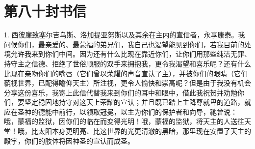 

\section{第八十封书信}

\par

\par

1. 西彼廉致塞尔吉乌斯、洛加提亚努斯以及其余在主内的宣信者，永享康泰。我问候你们，最亲爱的、最蒙福的弟兄们，我自己也渴望能见到你们，若我目前的处境允许我来到你们中间。因为还有什么比现在靠近你们，让你们用那些纯洁无罪、持守主之信德、拒绝了世俗顺服的双手来拥抱我，更令我渴望和喜乐呢？还有什么比现在亲吻你们的嘴唇（它们曾以荣耀的声音宣认了主），并被你们的眼睛（它们藐视世界，已配得瞻仰天主）所注视，更令人愉快和崇高呢？但是由于我没有机会分享这份喜乐，我寄上此信代替我来到你们的耳中和眼中，借此我祝贺并劝勉你们，要坚定稳固地持守对这天上荣耀的宣认；并且既已踏上主降尊就卑的道路，就应在圣神的德能中前行，以领取冠冕，以主为你们的保护者和向导，祂曾说： 哦，蒙福的监狱，因你们的临在而变得光明！哦，蒙福的监狱，将天主的人送往天堂！哦，比太阳本身更明亮、比这世界的光更清澈的黑暗，那里现在安置了天主的殿宇，你们的肢体将因神圣的宣认而成圣。\par


